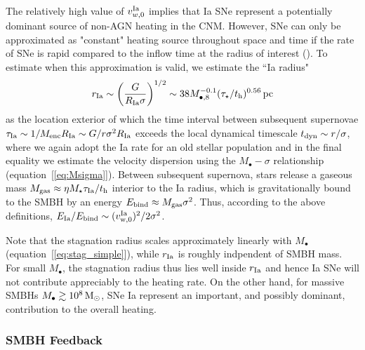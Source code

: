 \documentclass[usenatbib,fleqn]{mn2e}
\newcommand{\Mbh}[1][]{M_{\bullet#1}}
\newcommand{\rIa}{r_{\rm Ia}}
\begin{document}
The relatively high value of $v_{w,0}^{\rm Ia}$ implies that Ia SNe represent a potentially dominant source of non-AGN heating in the CNM.  However, SNe can only be approximated as "constant" heating source throughout space and time if the rate of SNe is rapid compared to the inflow time at the radius of interest
(\citealt{ShcherbakovWong+:2014a}).  To estimate when this
approximation is valid, we estimate the ``Ia radius"
\begin{align}
r_{\rm Ia} \sim \left(\frac{G}{R_{\rm Ia}\sigma}\right)^{1/2} \sim 38 M_{\bullet,8}^{-0.1}(\tau_{\star}/t_{\rm h})^{0.56}\,{\rm pc} 
\label{eq:rIa}
\end{align}
as the location exterior of which the time interval between subsequent
supernovae $\tau_{\rm Ia} \sim 1/M_{\rm enc}R_{\rm Ia} \sim
G/r\sigma^{2}R_{\rm Ia}$ exceeds the local dynamical timescale $t_{\rm
  dyn} \sim r/\sigma$, where we again adopt the Ia rate for an old
stellar population and in the final equality we estimate the velocity
dispersion using the $M_{\bullet}-\sigma$ relationship
(equation~[\ref{eq:Msigma}]).  Between subsequent supernova, stars release a gaseous mass $M_{\rm gas} \approx \eta M_{\star}\tau_{\rm Ia}/t_{\rm h}$ interior to the Ia radius, which is gravitationally bound to the SMBH by an energy $E_{\rm bind} \approx M_{\rm gas}\sigma^{2}$.  Thus, according to the above definitions, $E_{\rm Ia}/E_{\rm bind} \sim (v_{\rm w,0}^{\rm Ia})^{2}/2\sigma^{2}$.



Note that the stagnation radius scales approximately linearly with $M_{\bullet}$ (equation~[\ref{eq:stag_simple}]), while $\rIa$ is roughly indpendent of SMBH mass.  For small $\Mbh$, the stagnation radius thus lies well inside $\rIa$ and hence Ia SNe will not contribute appreciably to the heating rate.  On the other hand, for massive SMBHs $M_{\bullet} \gtrsim 10^8 \,{\rm M_\odot}$, SNe Ia  represent an important, and possibly dominant, contribution to the overall heating.

\subsubsection{SMBH Feedback}
\end{document}
